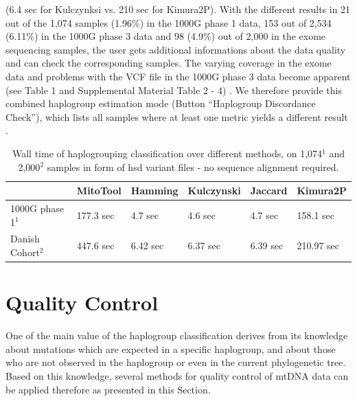 (6.4 sec for Kulczynksi vs. 210 sec for Kimura2P). With the different results in 21 out of the 1,074
samples (1.96\%) in the 1000G phase 1 data, 153 out of 2,534 (6.11\%) in the 1000G phase 3 data
and 98 (4.9\%) out of 2,000 in the exome sequencing samples, the user gets additional informations
about the data quality and can check the corresponding samples. The varying coverage in the exome data and problems with the VCF file in the 1000G phase 3 data become apparent (see Table 1
and Supplemental Material Table 2 - 4) \cite{Weissensteiner2016a}. We therefore provide this combined haplogroup estimation
mode (Button “Haplogroup Discordance Check”), which lists all samples where at least one metric
yields a different result \cite{Weissensteiner2016a}.

\begin{table}[H]
\centering

\begin{tabular}{|l|l|l|l|l|l|}
\hline
              & MitoTool  & Hamming  & Kulczynski & Jaccard  & Kimura2P   \\ \hline
1000G phase 1$^{1}$ & 177.3 sec & 4.7 sec  & 4.6 sec    & 4.7 sec  & 158.1 sec  \\ \hline
Danish Cohort$^{2}$ & 447.6 sec & 6.42 sec & 6.37 sec   & 6.39 sec & 210.97 sec \\ \hline
\end{tabular}
\caption{Wall time of haplogrouping classification over different methods, on 1,074$^{1}$ and 2,000$^{2}$ samples in form of hsd variant files - no sequence alignment required. }
\label{table:speed}
\end{table}



\section{Quality Control}\label{hg:qc}
One of the main value of the haplogroup classification derives from its knowledge about mutations which are expected in a specific haplogroup, and about those who are not observed in the haplogroup or even in the current phylogenetic tree. Based on this knowledge, several methods for quality control of mtDNA data can be applied therefore as presented in this Section.
